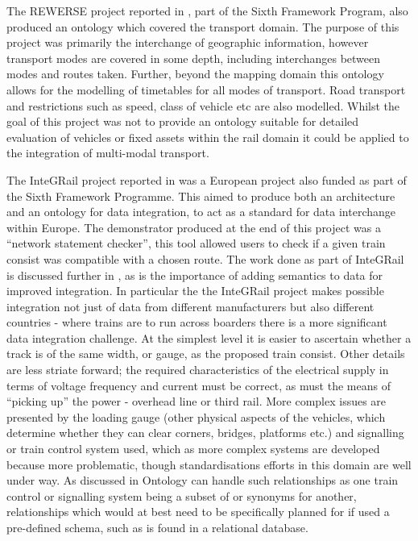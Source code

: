  The REWERSE project reported in \cite{Lorenz2005a}, part of the Sixth Framework Program, also produced an ontology which covered the transport domain. The purpose of this project was primarily the interchange of geographic information, however transport modes are covered in some depth, including interchanges between modes and routes taken. Further, beyond the mapping domain this ontology allows for the modelling of timetables for all modes of transport. Road transport and  restrictions such as speed, class of vehicle etc are also modelled. Whilst the goal of this project was not to provide an ontology suitable for detailed evaluation of vehicles or fixed assets within the rail domain it could be applied to the integration of multi-modal transport.

The InteGRail project reported in \cite{Kopf2010} was a European project also funded as part of the Sixth Framework Programme. This aimed to produce both an architecture and an ontology for data integration, to act as a standard for data interchange within Europe. The demonstrator produced at the end of this project was a ``network statement checker'', this tool allowed users to check if a given train consist was compatible with a chosen route. The work done as part of InteGRail is discussed further in \cite{Verstichel2011}, as is the importance of adding semantics to data for improved integration. In particular the the InteGRail project makes possible integration not just of data from different manufacturers but also different countries - where trains are to run across boarders there is a more significant data integration challenge. At the simplest level it is easier to ascertain whether a track is of the same width, or gauge, as the proposed train consist. Other details are less striate forward; the required characteristics of the electrical supply in terms of voltage frequency and current must be correct, as must the means of ``picking up'' the power - overhead line or third rail. More complex issues are presented by the loading gauge (other physical aspects of the vehicles, which determine whether they can clear corners, bridges, platforms etc.) and signalling or train control system used, which as  more complex systems are developed because more problematic, though standardisations efforts in this domain are well under way. As discussed in \cite{Verstichel2011} Ontology can handle such relationships as one train control or signalling system being a subset of or synonyms for another, relationships which would at best need to be specifically planned for if used a pre-defined schema, such as is found in a relational database.

